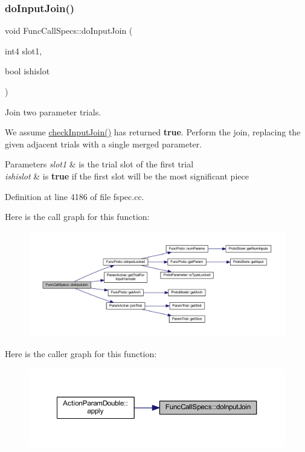 \subsubsection{\texorpdfstring{doInputJoin()}{doInputJoin()}}
{\footnotesize\ttfamily void Func\+Call\+Specs\+::do\+Input\+Join (\begin{DoxyParamCaption}\item[{int4}]{slot1,  }\item[{bool}]{ishislot }\end{DoxyParamCaption})}



Join two parameter trials. 

We assume \mbox{\hyperlink{class_func_call_specs_a808f3d0c962701b6c98bca1792e86908}{check\+Input\+Join()}} has returned {\bfseries{true}}. Perform the join, replacing the given adjacent trials with a single merged parameter. 
\begin{DoxyParams}{Parameters}
{\em slot1} & is the trial slot of the first trial \\
\hline
{\em ishislot} & is {\bfseries{true}} if the first slot will be the most significant piece \\
\hline
\end{DoxyParams}


Definition at line 4186 of file fspec.\+cc.

Here is the call graph for this function\+:
\nopagebreak
\begin{figure}[H]
\begin{center}
\leavevmode
\includegraphics[width=350pt]{class_func_call_specs_a489441d9d77d08bdf87eff937e8ef5b8_cgraph}
\end{center}
\end{figure}
Here is the caller graph for this function\+:
\nopagebreak
\begin{figure}[H]
\begin{center}
\leavevmode
\includegraphics[width=350pt]{class_func_call_specs_a489441d9d77d08bdf87eff937e8ef5b8_icgraph}
\end{center}
\end{figure}
\mbox{\label{class_func_call_specs_a48998cb808c1feedcad257f0984317ed}} 
